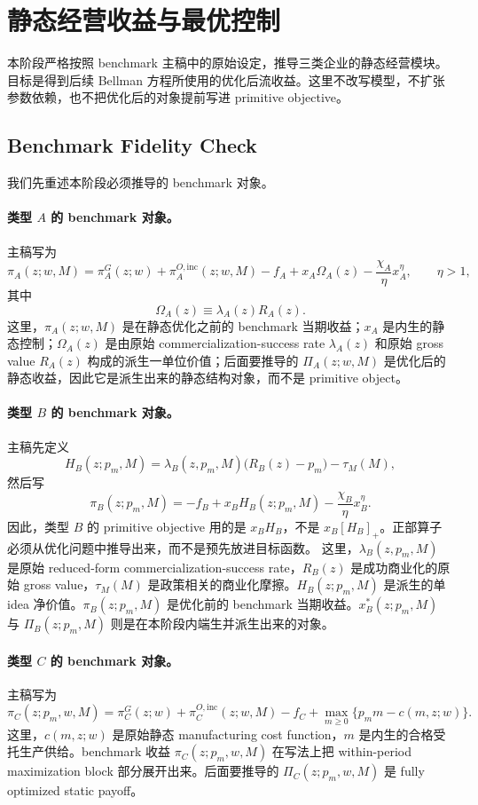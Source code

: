 ﻿\section{静态经营收益与最优控制}

本阶段严格按照 benchmark 主稿中的原始设定，推导三类企业的静态经营模块。目标是得到后续 Bellman 方程所使用的优化后流收益。这里不改写模型，不扩张参数依赖，也不把优化后的对象提前写进 primitive objective。

\subsection{Benchmark Fidelity Check}

我们先重述本阶段必须推导的 benchmark 对象。

\paragraph{类型 $A$ 的 benchmark 对象。}
主稿写为
\[
\pi_A(z;w,M)
=
\pi_A^G(z;w)+\pi_A^{O,\mathrm{inc}}(z;w,M)-f_A
+x_A\Omega_A(z)-\frac{\chi_A}{\eta}x_A^\eta,
\qquad \eta>1,
\]
其中
\[
\Omega_A(z)\equiv \lambda_A(z)R_A(z).
\]
这里，$\pi_A(z;w,M)$ 是在静态优化之前的 benchmark 当期收益；$x_A$ 是内生的静态控制；$\Omega_A(z)$ 是由原始 commercialization-success rate $\lambda_A(z)$ 和原始 gross value $R_A(z)$ 构成的派生一单位价值；后面要推导的 $\Pi_A(z;w,M)$ 是优化后的静态收益，因此它是派生出来的静态结构对象，而不是 primitive object。

\paragraph{类型 $B$ 的 benchmark 对象。}
主稿先定义
\[
H_B(z;p_m,M)=\lambda_B(z,p_m,M)\bigl(R_B(z)-p_m\bigr)-\tau_M(M),
\]
然后写
\[
\pi_B(z;p_m,M)
=
-f_B+x_BH_B(z;p_m,M)-\frac{\chi_B}{\eta}x_B^\eta.
\]
因此，类型 $B$ 的 primitive objective 用的是 $x_BH_B$，不是 $x_B[H_B]_+$。正部算子必须从优化问题中推导出来，而不是预先放进目标函数。
这里，$\lambda_B(z,p_m,M)$ 是原始 reduced-form commercialization-success rate，$R_B(z)$ 是成功商业化的原始 gross value，$\tau_M(M)$ 是政策相关的商业化摩擦。$H_B(z;p_m,M)$ 是派生的单 idea 净价值。$\pi_B(z;p_m,M)$ 是优化前的 benchmark 当期收益。$x_B^*(z;p_m,M)$ 与 $\Pi_B(z;p_m,M)$ 则是在本阶段内端生并派生出来的对象。

\paragraph{类型 $C$ 的 benchmark 对象。}
主稿写为
\[
\pi_C(z;p_m,w,M)
=
\pi_C^G(z;w)+\pi_C^{O,\mathrm{inc}}(z;w,M)-f_C
+\max_{m\ge 0}\{p_m m-c(m,z;w)\}.
\]
这里，$c(m,z;w)$ 是原始静态 manufacturing cost function，$m$ 是内生的合格受托生产供给。benchmark 收益 $\pi_C(z;p_m,w,M)$ 在写法上把 within-period maximization block 部分展开出来。后面要推导的 $\Pi_C(z;p_m,w,M)$ 是 fully optimized static payoff。

